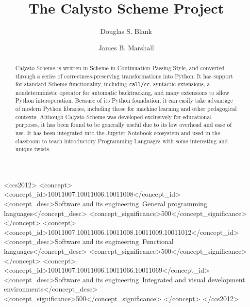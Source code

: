 \documentclass[acmsmall,screen,authorversion]{acmart}
\begin{document}
\title[Calysto Scheme]{The Calysto Scheme Project}

\author{Douglas S. Blank}

\author{James B. Marshall}

\renewcommand{\shortauthors}{D. S. Blank and J. B. Marshall}

\begin{abstract}
Calysto Scheme is written in Scheme in Continuation-Passing Style, and
converted through a series of correctness-preserving transformations into
Python. It has support for standard Scheme functionality, including
\texttt{call/cc}, syntactic extensions, a nondeterministic operator for
automatic backtracking, and many extensions to allow Python
interoperation. Because of its Python foundation, it can easily take advantage
of modern Python libraries, including those for machine learning and other
pedagogical contexts. Although Calysto Scheme was developed exclusively for
educational purposes, it has been found to be generally useful due to its
low overhead and ease of use. It has been integrated into the Jupyter Notebook
ecosystem and used in the classroom to teach introductory Programming Languages
with some interesting and unique twists.
\end{abstract}

\begin{CCSXML}
<ccs2012>
<concept>
<concept_id>10011007.10011006.10011008</concept_id>
<concept_desc>Software and its engineering~General programming languages</concept_desc>
<concept_significance>500</concept_significance>
</concept>
<concept>
<concept_id>10011007.10011006.10011008.10011009.10011012</concept_id>
<concept_desc>Software and its engineering~Functional languages</concept_desc>
<concept_significance>500</concept_significance>
</concept>
<concept>
<concept_id>10011007.10011006.10011066.10011069</concept_id>
<concept_desc>Software and its engineering~Integrated and visual development environments</concept_desc>
<concept_significance>500</concept_significance>
</concept>
</ccs2012>
\end{CCSXML}
\end{document}
